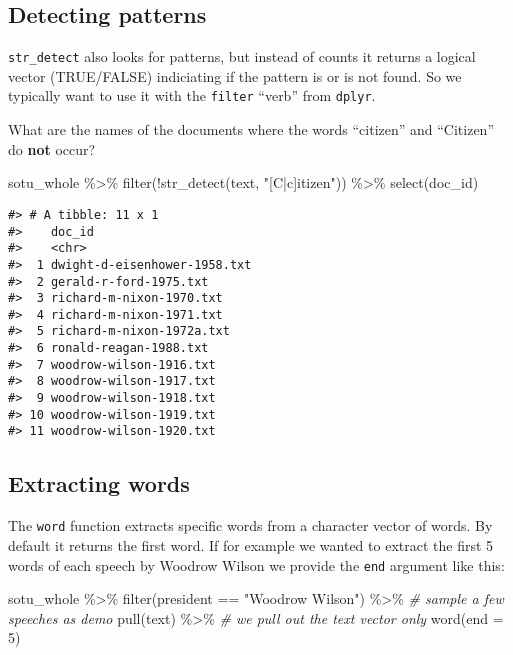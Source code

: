 \documentclass[
]{book}
\newenvironment{Shaded}{\begin{snugshade}}{\end{snugshade}}
\newcommand{\AttributeTok}[1]{\textcolor[rgb]{0.77,0.63,0.00}{#1}}
\newcommand{\CommentTok}[1]{\textcolor[rgb]{0.56,0.35,0.01}{\textit{#1}}}
\newcommand{\DecValTok}[1]{\textcolor[rgb]{0.00,0.00,0.81}{#1}}
\newcommand{\FunctionTok}[1]{\textcolor[rgb]{0.00,0.00,0.00}{#1}}
\newcommand{\NormalTok}[1]{#1}
\newcommand{\SpecialCharTok}[1]{\textcolor[rgb]{0.00,0.00,0.00}{#1}}
\newcommand{\StringTok}[1]{\textcolor[rgb]{0.31,0.60,0.02}{#1}}
\begin{document}
\hypertarget{detecting-patterns}{%
\subsection{Detecting patterns}\label{detecting-patterns}}

\texttt{str\_detect} also looks for patterns, but instead of counts it returns a logical vector (TRUE/FALSE) indiciating if the pattern is or is not found. So we typically want to use it with the \texttt{filter} ``verb'' from \texttt{dplyr}.

What are the names of the documents where the words ``citizen'' and ``Citizen'' do \textbf{not} occur?

\begin{Shaded}
\begin{Highlighting}[]
\NormalTok{sotu\_whole }\SpecialCharTok{\%\textgreater{}\%} 
  \FunctionTok{filter}\NormalTok{(}\SpecialCharTok{!}\FunctionTok{str\_detect}\NormalTok{(text, }\StringTok{"[C|c]itizen"}\NormalTok{)) }\SpecialCharTok{\%\textgreater{}\%} 
  \FunctionTok{select}\NormalTok{(doc\_id) }
\end{Highlighting}
\end{Shaded}

\begin{verbatim}
#> # A tibble: 11 x 1
#>    doc_id                      
#>    <chr>                       
#>  1 dwight-d-eisenhower-1958.txt
#>  2 gerald-r-ford-1975.txt      
#>  3 richard-m-nixon-1970.txt    
#>  4 richard-m-nixon-1971.txt    
#>  5 richard-m-nixon-1972a.txt   
#>  6 ronald-reagan-1988.txt      
#>  7 woodrow-wilson-1916.txt     
#>  8 woodrow-wilson-1917.txt     
#>  9 woodrow-wilson-1918.txt     
#> 10 woodrow-wilson-1919.txt     
#> 11 woodrow-wilson-1920.txt
\end{verbatim}

\hypertarget{extracting-words}{%
\subsection{Extracting words}\label{extracting-words}}

The \texttt{word} function extracts specific words from a character vector of words. By default it returns the first word. If for example we wanted to extract the first 5 words of each speech by Woodrow Wilson we provide the \texttt{end} argument like this:

\begin{Shaded}
\begin{Highlighting}[]
\NormalTok{sotu\_whole }\SpecialCharTok{\%\textgreater{}\%} 
  \FunctionTok{filter}\NormalTok{(president }\SpecialCharTok{==} \StringTok{"Woodrow Wilson"}\NormalTok{) }\SpecialCharTok{\%\textgreater{}\%}  \CommentTok{\# sample a few speeches as demo}
  \FunctionTok{pull}\NormalTok{(text) }\SpecialCharTok{\%\textgreater{}\%} \CommentTok{\# we pull out the text vector only}
  \FunctionTok{word}\NormalTok{(}\AttributeTok{end =} \DecValTok{5}\NormalTok{) }
\end{Highlighting}
\end{Shaded}
\end{document}
